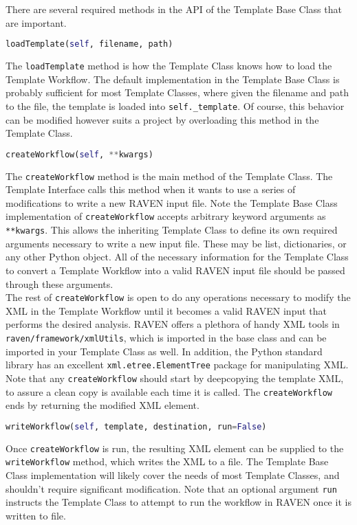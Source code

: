 There are several required methods in the API of the Template Base Class that are important.
\begin{lstlisting}[language=python]
 loadTemplate(self, filename, path)
\end{lstlisting}
The \texttt{loadTemplate} method is how the Template Class knows how to load the Template Workflow. The default implementation in the Template Base Class is probably sufficient for most Template Classes, where given the filename and path to the file, the template is loaded into \texttt{self.\_template}. Of course, this behavior can be modified however suits a project by overloading this method in the Template Class.

\begin{lstlisting}[language=python]
 createWorkflow(self, **kwargs)
\end{lstlisting}
The \texttt{createWorkflow} method is the main method of the Template Class. The Template Interface calls this method when it wants to use a series of modifications to write a new RAVEN input file. Note the Template Base Class implementation of \texttt{createWorkflow} accepts arbitrary keyword arguments as \texttt{**kwargs}. This allows the inheriting Template Class to define its own required arguments necessary to write a new input file. These may be list, dictionaries, or any other Python object. All of the necessary information for the Template Class to convert a Template Workflow into a valid RAVEN input file should be passed through these arguments.
\\

The rest of \texttt{createWorkflow} is open to do any operations necessary to modify the XML in the Template Workflow until it becomes a valid RAVEN input that performs the desired analysis. RAVEN offers a plethora of handy XML tools in
\texttt{raven/framework/xmlUtils}, which is imported in the base class and can be imported in your Template Class as well. In addition, the Python standard library has an excellent \texttt{xml.etree.ElementTree} package for manipulating XML.  Note that any \texttt{createWorkflow} should start by deepcopying the template XML, to assure a clean copy is available each time it is called. The \texttt{createWorkflow} ends by returning the modified XML element.

\begin{lstlisting}[language=python]
 writeWorkflow(self, template, destination, run=False)
\end{lstlisting}
Once \texttt{createWorkflow} is run, the resulting XML element can be supplied to the \texttt{writeWorkflow} method, which writes the XML to a file. The Template Base Class implementation will likely cover the needs of most Template Classes, and shouldn't require significant modification. Note that an optional argument \texttt{run} instructs the Template Class to attempt to run the workflow in RAVEN once it is written to file.
\\

